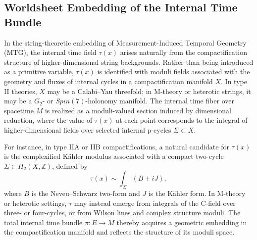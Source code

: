 \documentclass[11pt]{article}
\begin{document}
\subsection{Worldsheet Embedding of the Internal Time Bundle}

In the string-theoretic embedding of Measurement-Induced Temporal Geometry (MTG), the internal time field \( \tau(x) \) arises naturally from the compactification structure of higher-dimensional string backgrounds. Rather than being introduced as a primitive variable, \( \tau(x) \) is identified with moduli fields associated with the geometry and fluxes of internal cycles in a compactification manifold \( X \). In type II theories, \( X \) may be a Calabi--Yau threefold; in M-theory or heterotic strings, it may be a \( G_2 \)- or \( Spin(7) \)-holonomy manifold. The internal time fiber over spacetime \( M \) is realized as a moduli-valued section induced by dimensional reduction, where the value of \( \tau(x) \) at each point corresponds to the integral of higher-dimensional fields over selected internal p-cycles \( \Sigma \subset X \).

For instance, in type IIA or IIB compactifications, a natural candidate for \( \tau(x) \) is the complexified Kähler modulus associated with a compact two-cycle \( \Sigma \in H_2(X, \mathbb{Z}) \), defined by
\begin{equation}
\tau(x) \sim \int_{\Sigma} (B + i J),
\end{equation}
where \( B \) is the Neveu--Schwarz two-form and \( J \) is the Kähler form. In M-theory or heterotic settings, \( \tau \) may instead emerge from integrals of the C-field over three- or four-cycles, or from Wilson lines and complex structure moduli. The total internal time bundle \( \pi: E \to M \) thereby acquires a geometric embedding in the compactification manifold and reflects the structure of its moduli space.
\end{document}
